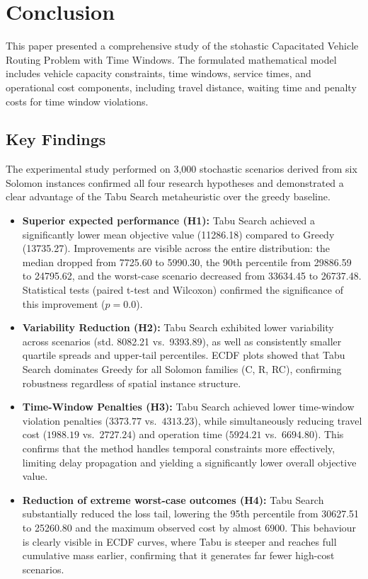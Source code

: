 \section{Conclusion}

This paper presented a comprehensive study of the stohastic Capacitated Vehicle Routing Problem with Time Windows. The formulated mathematical model includes vehicle capacity constraints, time windows, service times, and operational cost components, including travel distance, waiting time and penalty costs for time window violations.


\subsection{Key Findings}

The experimental study performed on 3,000 stochastic scenarios derived from six Solomon instances confirmed all four research hypotheses and demonstrated a clear advantage of the Tabu Search metaheuristic over the greedy baseline.

\begin{itemize}
    \item \textbf{ Superior expected performance (H1):}  
    Tabu Search achieved a significantly lower mean objective value (11286.18) compared to Greedy (13735.27).  
    Improvements are visible across the entire distribution: the median dropped from 7725.60 to 5990.30, 
    the 90th percentile from 29886.59 to 24795.62, 
    and the worst-case scenario decreased from 33634.45 to 26737.48.  
    Statistical tests (paired t-test and Wilcoxon) confirmed the significance of this improvement ($p=0.0$).
    
    \item \textbf{Variability Reduction (H2):}
    Tabu Search exhibited lower variability across scenarios (std. 8082.21 vs.\ 9393.89), 
    as well as consistently smaller quartile spreads and upper-tail percentiles.  
    ECDF plots showed that Tabu Search dominates Greedy for all Solomon families (C, R, RC), 
    confirming robustness regardless of spatial instance structure.

    \item \textbf{Time-Window Penalties (H3):} 
    Tabu Search achieved lower time-window violation penalties ($3373.77$ vs.\ $4313.23$), while simultaneously reducing travel cost ($1988.19$ vs.\ $2727.24$) and operation time ($5924.21$ vs.\ $6694.80$). 
    This confirms that the method handles temporal constraints more effectively, limiting delay propagation and yielding a significantly lower overall objective value.

    \item \textbf{Reduction of extreme worst-case outcomes (H4):}  
    Tabu Search substantially reduced the loss tail, lowering the 95th percentile from 30627.51 to 25260.80 
    and the maximum observed cost by almost 6900.  
    This behaviour is clearly visible in ECDF curves, where Tabu is steeper and reaches full cumulative mass earlier, 
    confirming that it generates far fewer high-cost scenarios.
\end{itemize}

